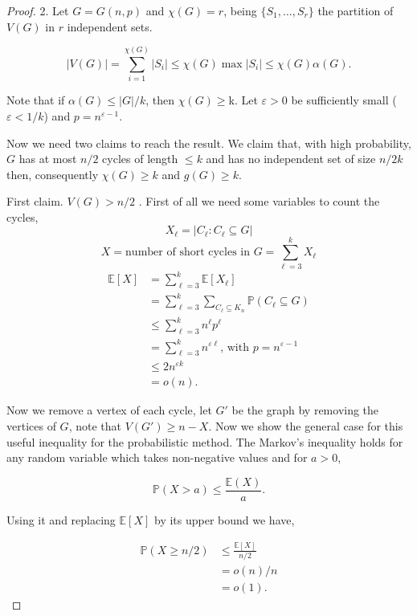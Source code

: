 \documentclass[12pt,twoside,a4paper,bibliography=totocnumbered]{book}
\numberwithin{equation}{section}
\theoremstyle{remark}
\begin{document}
\begin{proof}2. Let $G = G(n,p)$ and $\chi(G) = r$, being $\{S_1, \ldots, S_{r}\}$ the partition of $V(G)$ in $r$ independent sets.

$$ |V(G)| = \sum_{i=1}^{\chi(G)} |S_i| \leq \chi(G)\max|S_i| \leq \chi(G) \alpha (G) .$$

Note that if $\alpha(G) \leq |G|/k$, then $\chi(G) \geq $k. Let $\varepsilon > 0$ be sufficiently small ($\varepsilon < 1/k$) and $p = n^{\varepsilon - 1}$.%

Now we need two claims to reach the result. We claim that, with high probability, $G$ has at most $n/2$ cycles of length $\leq k$ and has no independent set  of size $n/2k$ then, consequently $\chi(G) \geq k$ and $g(G) \geq k$.

First claim. $V(G) > n/2$ . First of all we need some variables to count the cycles,
$$X_{\ell} =  |C_{\ell} \colon C_{\ell} \subseteq G|$$
$$X = \text{number of short cycles in $G$} = \sum_{{\ell}=3}^k X_{\ell}$$
\begin{align*}
\mathbb{E}[X] &= \sum_{{\ell}=3}^k \mathbb{E}[X_{\ell}] \\
	       &= \sum_{{\ell}=3}^k \sum_{C_{\ell} \subseteq K_n} \mathbb{P}(C_{\ell} \subseteq G)\\
	       &\leq \sum_{{\ell}=3}^k n^{\ell} p^{\ell} \\
	       &= \sum_{{\ell}=3}^k n^{\varepsilon {\ell}}\text{, with } p= n^{\varepsilon - 1}\\
	       &\leq 2n^{\varepsilon k} \\
	       &= o(n).
\end{align*}

Now we remove a vertex of each cycle, let $G'$ be the graph by removing the vertices of $G$, note that $V(G') \geq n-X$. Now we show the general case for this useful inequality for the probabilistic method. The Markov's inequality holds for any random variable which takes non-negative values and for $a>0$,

$$\mathbb{P}(X>a) \leq \frac{\mathbb{E}(X)}{a}.$$

Using it and replacing $\mathbb{E}[X]$ by its upper bound we have,

\begin{align*}
\mathbb{P}(X\geq n/2) &\leq \frac{\mathbb{E}[X]}{n/2}\\
		& = o(n)/n\\
		& = o(1).
\end{align*}


\end{proof}
\end{document}
